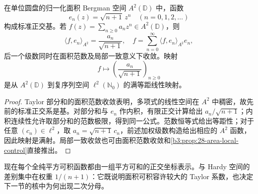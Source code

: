 \begin{corollary}\label{b3:cor:28-bergman-basis}
在单位圆盘的归一化面积 Bergman 空间 \(A^2(\mathbb D)\) 中，函数
\[
 e_n(z)=\sqrt{n+1}\,z^n\quad(n=0,1,2,\ldots)
\]
构成标准正交基。若 \(f(z)=\sum_{n\ge0}a_nz^n\in A^2(\mathbb D)\)，则
\[
 \langle f,e_n\rangle_{A^2}=\frac{a_n}{\sqrt{n+1}},
 \quad
 f=\sum_{n=0}^{\infty}\langle f,e_n\rangle_{A^2}e_n,
\]
后一个级数同时在面积范数及局部一致意义下收敛。映射
\[
 f\longmapsto\left(\frac{a_n}{\sqrt{n+1}}\right)_{n\ge0}
\]
是从 \(A^2(\mathbb D)\) 到复序列空间 \(\ell^2(\mathbb N_0)\) 的满等距线性映射。
\end{corollary}
\begin{proof}
Taylor 部分和的面积范数收敛表明，多项式的线性空间在 \(A^2\) 中稠密，故先前的标准正交系是基。对部分和与 \(e_n\) 作内积，有限正交计算给出 \(a_n/\sqrt{n+1}\)；内积连续性允许取部分和的范数极限，得到同一公式。范数恒等式给出等距性；对于任意 \((c_n)\in\ell^2\)，取 \(a_n=\sqrt{n+1}\,c_n\)，前述加权级数构造给出相应的 \(A^2\) 函数，因此映射是满射。局部一致收敛也可由面积范数收敛和\cref{b3:prop:28-area-local-control}直接推出。
\end{proof}

现在每个全纯平方可积函数都由一组平方可和的正交坐标表示。与 Hardy 空间的差别集中在权重 \(1/(n+1)\)：它既说明面积可积容许较大的 Taylor 系数，也决定下一节的核中为何出现二次分母。

